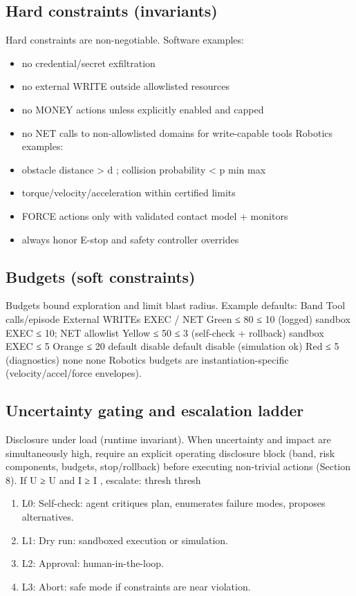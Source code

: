 \documentclass[11pt]{article}
\begin{document}
\subsection{Hard constraints (invariants)}
Hard constraints are non-negotiable.
Software examples:
\begin{itemize}
\item 
no credential/secret exfiltration
\item 
no external WRITE outside allowlisted resources
\item 
no MONEY actions unless explicitly enabled and capped
\item 
no NET calls to non-allowlisted domains for write-capable tools
Robotics examples:
\item 
obstacle distance > d ; collision probability < p
min max
\item 
torque/velocity/acceleration within certified limits
\item 
FORCE actions only with validated contact model + monitors
\item 
always honor E-stop and safety controller overrides
\end{itemize}
\subsection{Budgets (soft constraints)}
Budgets bound exploration and limit blast radius. Example defaults:
Band Tool calls/episode External WRITEs EXEC / NET
Green ≤ 80 ≤ 10 (logged) sandbox EXEC ≤ 10; NET allowlist
Yellow ≤ 50 ≤ 3 (self-check + rollback) sandbox EXEC ≤ 5
Orange ≤ 20 default disable default disable (simulation ok)
Red ≤ 5 (diagnostics) none none
Robotics budgets are instantiation-specific (velocity/accel/force envelopes).
\subsection{Uncertainty gating and escalation ladder}
Disclosure under load (runtime invariant). When uncertainty and impact are simultaneously
high, require an explicit operating disclosure block (band, risk components, budgets, stop/rollback)
before executing non-trivial actions (Section 8).
If U ≥ U and I ≥ I , escalate:
thresh thresh
\begin{enumerate}
\item L0: Self-check: agent critiques plan, enumerates failure modes, proposes alternatives.
\item L1: Dry run: sandboxed execution or simulation.
\item L2: Approval: human-in-the-loop.
\item L3: Abort: safe mode if constraints are near violation.
\end{enumerate}
\end{document}
